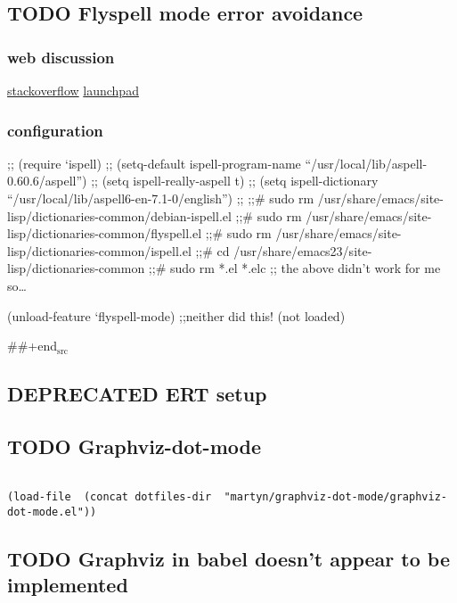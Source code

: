 \documentclass[colorlinks=true,urlcolor=blue,listings-sv]{article}
\begin{document}
{{{\subsection{\textbf{TODO} Flyspell mode error avoidance}
\label{sec-2-33}
\subsubsection{web discussion}
\label{sec-2-33-1}


\href{http://stackoverflow.com/questions/1781762/enabling-flyspell-mode-gives-an-error}{stackoverflow}
\href{https://bugs.launchpad.net/ubuntu/%2Bsource/dictionaries-common/%2Bbug/619015}{launchpad}
\subsubsection{configuration}
\label{sec-2-33-2}


;; (require `ispell)
;; (setq-default ispell-program-name ``/usr/local/lib/aspell-0.60.6/aspell'')
;; (setq ispell-really-aspell t)
;; (setq ispell-dictionary ``/usr/local/lib/aspell6-en-7.1-0/english'')
;; ;;\# sudo rm /usr/share/emacs/site-lisp/dictionaries-common/debian-ispell.el
;;\# sudo rm /usr/share/emacs/site-lisp/dictionaries-common/flyspell.el
;;\# sudo rm /usr/share/emacs/site-lisp/dictionaries-common/ispell.el
;;\# cd /usr/share/emacs23/site-lisp/dictionaries-common
;;\# sudo rm *.el *.elc
;; the above didn't work for me so\ldots{}

(unload-feature `flyspell-mode)
;;neither did this! (not loaded)

 \#\#+end$_{\mathrm{src}}$
\subsection{\textbf{DEPRECATED} ERT setup}
\label{sec-2-34}
\subsection{\textbf{TODO} Graphviz-dot-mode}
\label{sec-2-35}



\lstset{language=Lisp}
\begin{lstlisting}

(load-file  (concat dotfiles-dir  "martyn/graphviz-dot-mode/graphviz-dot-mode.el"))
\end{lstlisting}
\subsection{\textbf{TODO} Graphviz in babel doesn't appear to be implemented}
\label{sec-2-36}
}}}
\end{document}
